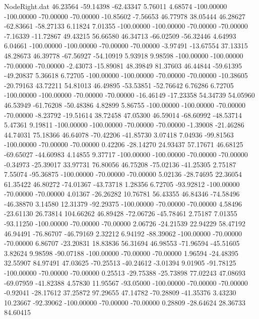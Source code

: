 \begin{filecontents}{NodeRight.dat}
  46.23564  -59.14398  -62.43347     5.76011    4.68574 -100.00000 -100.00000  -70.00000  -70.00000  -10.85602   -7.56653   46.77978   38.05444
  46.28627  -62.83661  -58.27133     6.11824    7.01355 -100.00000 -100.00000  -70.00000  -70.00000   -7.16339  -11.72867   49.43215   56.66580
  46.34713  -66.02509  -56.32446     4.64993    6.04661 -100.00000 -100.00000  -70.00000  -70.00000   -3.97491  -13.67554   37.13315   48.28673
  46.39778  -67.56927  -54.10919     5.93918    9.98598 -100.00000 -100.00000  -70.00000  -70.00000   -2.43073  -15.89081   48.39849   81.37603
  46.44844  -59.61395  -49.20837     5.36618    6.72705 -100.00000 -100.00000  -70.00000  -70.00000  -10.38605  -20.79163   43.72211   54.81013
  46.49895  -53.53851  -52.76642     6.76286    6.72705 -100.00000 -100.00000  -70.00000  -70.00000  -16.46149  -17.23358   54.34739   54.05960
  46.53949  -61.76208  -50.48386     4.82899    5.86755 -100.00000 -100.00000  -70.00000  -70.00000   -8.23792  -19.51614   38.72458   47.05300
  46.59014  -68.60992  -48.53714     5.47361    9.19811 -100.00000 -100.00000  -70.00000  -70.00000   -1.39008  -21.46286   44.74031   75.18366
  46.64078  -70.42206  -41.85730     3.07418    7.04936  -99.81563 -100.00000  -70.00000  -70.00000    0.42206  -28.14270   24.93437   57.17671
  46.68125  -69.65027  -44.60983     4.14855    9.37717 -100.00000 -100.00000  -70.00000  -70.00000   -0.34973  -25.39017   33.97731   76.80056
  46.75208  -75.02136  -41.25305     2.75187    7.55074  -95.36875 -100.00000  -70.00000  -70.00000    5.02136  -28.74695   22.36054   61.35422
  46.80272  -74.01367  -43.73718     1.28356    6.72705  -93.92812 -100.00000  -70.00000  -70.00000    4.01367  -26.26282   10.76781   56.43355
  46.84346  -74.58496  -46.38870     3.14580   12.31379  -92.29375 -100.00000  -70.00000  -70.00000    4.58496  -23.61130   26.73814  104.66262
  46.89428  -72.06726  -45.78461     2.75187    7.01355  -93.11250 -100.00000  -70.00000  -70.00000    2.06726  -24.21539   22.94229   58.47192
  46.94491  -76.86707  -46.79169     2.32212    6.94192  -88.39062 -100.00000  -70.00000  -70.00000    6.86707  -23.20831   18.83836   56.31694
  46.98553  -71.96594  -45.51605     3.82624    9.98598  -90.07188 -100.00000  -70.00000  -70.00000    1.96594  -24.48395   32.55907   84.97491
  47.03625  -70.25513  -40.24612    -3.01394    9.01905  -91.78125 -100.00000  -70.00000  -70.00000    0.25513  -29.75388  -25.73898   77.02243
  47.08693  -69.07959  -41.82388     4.57830   11.95567  -93.05000 -100.00000  -70.00000  -70.00000   -0.92041  -28.17612   37.25872   97.29655
  47.14782  -70.28809  -41.35376     3.43230   10.23667  -92.39062 -100.00000  -70.00000  -70.00000    0.28809  -28.64624   28.36733   84.60415

\end{filecontents}
